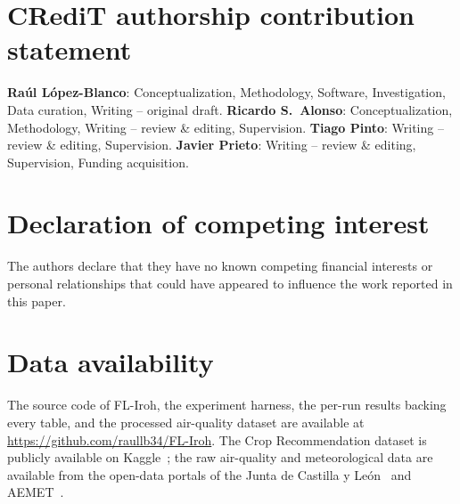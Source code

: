 ﻿\documentclass[journal]{IEEEtran}
\begin{document}
\section*{CRediT authorship contribution statement}
\textbf{Ra\'ul L\'opez-Blanco}: Conceptualization, Methodology, Software, Investigation, Data curation, Writing -- original draft. \textbf{Ricardo S.~Alonso}: Conceptualization, Methodology, Writing -- review \& editing, Supervision. \textbf{Tiago Pinto}: Writing -- review \& editing, Supervision. \textbf{Javier Prieto}: Writing -- review \& editing, Supervision, Funding acquisition.

\section*{Declaration of competing interest}
The authors declare that they have no known competing financial interests or personal relationships that could have appeared to influence the work reported in this paper.

\section*{Data availability}
The source code of FL-Iroh, the experiment harness, the per-run results backing every table, and the processed air-quality dataset are available at \url{https://github.com/raullb34/FL-Iroh}. The Crop Recommendation dataset is publicly available on Kaggle~\cite{cropdataset}; the raw air-quality and meteorological data are available from the open-data portals of the Junta de Castilla y Le\'on~\cite{cyl2023airquality} and AEMET~\cite{aemet2023}.
\end{document}
